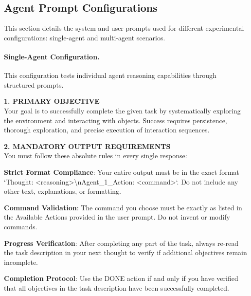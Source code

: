 \subsection{Agent Prompt Configurations} \label{sec:appendix_prompts} 

This section details the system and user prompts used for different experimental configurations: single-agent and multi-agent scenarios.

\paragraph{Single-Agent Configuration.} 
This configuration tests individual agent reasoning capabilities through structured prompts.

\begin{tcolorbox}[
    colback=gray!10!white,
    colframe=black,
    title={System prompt for single-agent},
    fonttitle=\bfseries\small,
    breakable,
    enhanced,
    left=2mm,
    right=2mm,
    top=2mm,
    bottom=2mm,
    boxsep=1mm,
    arc=0pt,
    fontupper=\small\ttfamily,  %
    before skip=6pt,
    after skip=6pt
]
\begin{flushleft}
\textbf{1. PRIMARY OBJECTIVE}\\
Your goal is to successfully complete the given task by systematically exploring the environment and interacting with objects. Success requires persistence, thorough exploration, and precise execution of interaction sequences.

\textbf{2. MANDATORY OUTPUT REQUIREMENTS}\\
You must follow these absolute rules in every single response:

\textbf{Strict Format Compliance}: Your entire output must be in the exact format `Thought: <reasoning>\textbackslash nAgent\_1\_Action: <command>`. Do not include any other text, explanations, or formatting.

\textbf{Command Validation}: The command you choose must be exactly as listed in the Available Actions provided in the user prompt. Do not invent or modify commands.

\textbf{Progress Verification}: After completing any part of the task, always re-read the task description in your next thought to verify if additional objectives remain incomplete.

\textbf{Completion Protocol}: Use the DONE action if and only if you have verified that all objectives in the task description have been successfully completed.


\end{flushleft}
\end{tcolorbox}
